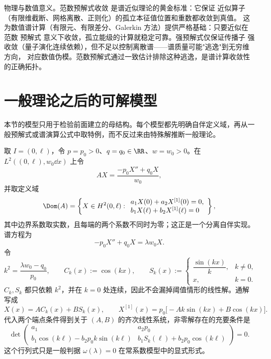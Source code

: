 物理与数值意义。范数预解式收敛 是谱近似理论的黄金标准：它保证
近似算子（有限维截断、网格离散、正则化）的孤立本征值位置和重数都收敛到真值。
这为数值谱计算（有限元、有限差分、Galerkin 方法）提供严格基础：只要近似在 范数
预解式 意义下收敛，孤立能级的计算就稳定可靠。强预解式仅保证传播子
强收敛（量子演化连续依赖），但不足以控制离散谱——谱质量可能"逃逸"到无穷维方向，
对应数值伪模。范数预解式通过一致估计排除这种逃逸，是谱计算收敛性的正确拓扑。



\section{一般理论之后的可解模型}

本节的模型只用于检验前面建立的母结构。每个模型都先明确自伴定义域，再从一般预解式或谱演算公式中取特例，而不反过来由特殊解推断一般理论。
\begin{exbox}[常系数分离边界的特征方程]\label{ex:math-sl-regular-robin-eigen}
取 $I=(0,\ell)$，令 $p=p_0>0$、$q=q_0\in\RR$、$w=w_0>0$。在 $L^2((0,\ell),w_0\dd x)$ 上令
\[
 AX=\frac{-p_0X''+q_0X}{w_0},
\]
并取定义域
\[
 \Dom(A)=\left\{X\in H^2(0,\ell):
 \begin{array}{l}
 a_1X(0)+a_2X^{[1]}(0)=0,\\
 b_1X(\ell)+b_2X^{[1]}(\ell)=0
 \end{array}\right\},
\]
其中边界系数取实数，且每端的两个系数不同时为零；这正是一个分离自伴实现。谱方程为
\[
 -p_0X''+q_0X=\lambda w_0X.
\]
令
\[
 k^2=\frac{\lambda w_0-q_0}{p_0},
 \qquad
 C_k(x):=\cos(kx),
 \qquad
 S_k(x):=
 \begin{cases}
 \dfrac{\sin(kx)}{k},&k\neq0,\\[1ex]
 x,&k=0.
 \end{cases}
\]
$C_k,S_k$ 都只依赖 $k^2$，并在 $k=0$ 处连续，因此不会漏掉阈值情形的线性解。通解写成
\[
 X(x)=A C_k(x)+B S_k(x),
 \qquad
 X^{[1]}(x)=p_0\bigl[-A k\sin(kx)+B\cos(kx)\bigr].
\]
代入两个端点条件得到关于 $(A,B)$ 的齐次线性系统，非零解存在的充要条件是
\begin{equation*}\det\begin{pmatrix}
 a_1&a_2p_0\\
 b_1\cos(k\ell)-b_2p_0k\sin(k\ell)&
 b_1S_k(\ell)+b_2p_0\cos(k\ell)
 \end{pmatrix}=0.
\end{equation*}
这个行列式只是一般判据 $\omega(\lambda)=0$ 在常系数模型中的显式形式。
\end{exbox}

